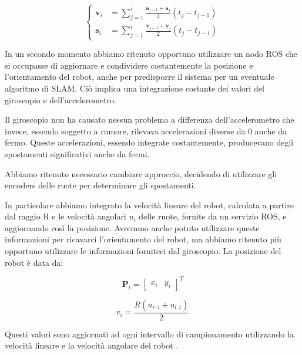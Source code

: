 \documentclass[a4paper]{article}
\begin{document}
	\begin{equation}\label{eq:accel-integration}
		\begin{cases}
			\textbf{v}_i & = \sum_{j=1}^{i} \frac{\textbf{a} _{j-1}+\textbf{a} _j}{2} \left( t_j-t_{j-1} \right) \\
			\textbf{s}_i & = \sum_{j=1}^{i} \frac{\textbf{v} _{j-1}+\textbf{v} _j}{2} \left( t_j-t_{j-1} \right) 
		\end{cases}
	\end{equation}
	
	In un secondo momento abbiamo ritenuto opportuno utilizzare un nodo ROS che
	si occupasse di aggiornare e condividere costantemente la posizione e
	l'orientamento del robot, anche per predisporre il sistema per un eventuale
	algoritmo di SLAM.  Ciò implica una integrazione costante dei valori del
	giroscopio e dell'accelerometro. 
	
	Il giroscopio non ha causato nessun problema a differenza
	dell'accelerometro che invece, essendo soggetto a rumore, rilevava
	accelerazioni diverse da 0 anche da fermo. Queste accelerazioni, essendo
	integrate costantemente, producevano degli spostamenti significativi anche
	da fermi. 
	
	Abbiamo ritenuto necessario cambiare approccio, decidendo di utilizzare gli
	encoders delle ruote per determinare gli spostamenti. 
	
	In particolare abbiamo integrato la velocità lineare del robot, calcolata a
	partire dal raggio R e le velocità angolari $u_i$ delle ruote, fornite da
	un servizio ROS, e aggiornando così la posizione. Avremmo anche potuto
	utilizzare queste informazioni per ricavarci l'orientamento del robot, ma
	abbiamo ritenuto più opportuno utilizzare le informazioni forniteci dal
	giroscopio. La posizione del robot è data da:
	
	\begin{equation}\label{eq:position-vector}
		\textbf{P}_i = \begin{bmatrix}
			  x_i & y_i  
		\end{bmatrix}^T
	\end{equation}
	
	\begin{equation}\label{eq:linear-velocity}
		v_i = \frac{R (u_{r,i}+u_{l,i})}{2}
	\end{equation}
	
	Questi valori sono aggiornati ad ogni intervallo di campionamento utilizzando la velocità lineare e la velocità angolare del robot \cite{572228}.
	
\end{document}
